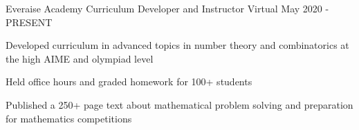 \begin{cventries}
  \cventry
    {Everaise Academy} %
    {Curriculum Developer and Instructor } %
    {Virtual} %
    {May 2020 - PRESENT} %
    {
      \begin{cvitems} %
        \item {Developed curriculum in advanced topics in number theory and combinatorics at the high AIME and olympiad level}
        \item {Held office hours and graded homework for 100+ students}
        \item {Published a 250+ page text about mathematical problem solving and preparation for mathematics competitions}
      \end{cvitems}
    }
\end{cventries}
